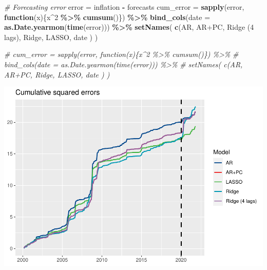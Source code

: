 \documentclass[
]{article}
\newenvironment{Shaded}{\begin{snugshade}}{\end{snugshade}}
\newcommand{\AttributeTok}[1]{\textcolor[rgb]{0.13,0.29,0.53}{#1}}
\newcommand{\CommentTok}[1]{\textcolor[rgb]{0.56,0.35,0.01}{\textit{#1}}}
\newcommand{\ControlFlowTok}[1]{\textcolor[rgb]{0.13,0.29,0.53}{\textbf{#1}}}
\newcommand{\DecValTok}[1]{\textcolor[rgb]{0.00,0.00,0.81}{#1}}
\newcommand{\FunctionTok}[1]{\textcolor[rgb]{0.13,0.29,0.53}{\textbf{#1}}}
\newcommand{\NormalTok}[1]{#1}
\newcommand{\OtherTok}[1]{\textcolor[rgb]{0.56,0.35,0.01}{#1}}
\newcommand{\SpecialCharTok}[1]{\textcolor[rgb]{0.81,0.36,0.00}{\textbf{#1}}}
\newcommand{\StringTok}[1]{\textcolor[rgb]{0.31,0.60,0.02}{#1}}
\begin{document}
\begin{Shaded}
\begin{Highlighting}[]
\CommentTok{\# Forecasting error}
\NormalTok{error }\OtherTok{=}\NormalTok{ inflation }\SpecialCharTok{{-}}\NormalTok{ forecasts}
\NormalTok{cum\_error }\OtherTok{=} \FunctionTok{sapply}\NormalTok{(error, }\ControlFlowTok{function}\NormalTok{(x)\{x}\SpecialCharTok{\^{}}\DecValTok{2} \SpecialCharTok{\%\textgreater{}\%} \FunctionTok{cumsum}\NormalTok{()\}) }\SpecialCharTok{\%\textgreater{}\%}
 \FunctionTok{bind\_cols}\NormalTok{(}\AttributeTok{date =} \FunctionTok{as.Date.yearmon}\NormalTok{(}\FunctionTok{time}\NormalTok{(error))) }\SpecialCharTok{\%\textgreater{}\%}
 \FunctionTok{setNames}\NormalTok{( }\FunctionTok{c}\NormalTok{(}\StringTok{\textquotesingle{}AR\textquotesingle{}}\NormalTok{, }\StringTok{\textquotesingle{}AR+PC\textquotesingle{}}\NormalTok{, }\StringTok{\textquotesingle{}Ridge (4 lags)\textquotesingle{}}\NormalTok{, }\StringTok{\textquotesingle{}Ridge\textquotesingle{}}\NormalTok{, }\StringTok{\textquotesingle{}LASSO\textquotesingle{}}\NormalTok{, }\StringTok{\textquotesingle{}date\textquotesingle{}}\NormalTok{ ) )}


\CommentTok{\# cum\_error = sapply(error, function(x)\{x\^{}2 \%\textgreater{}\% cumsum()\}) \%\textgreater{}\%}
\CommentTok{\#   bind\_cols(date = as.Date.yearmon(time(error))) \%\textgreater{}\%}
\CommentTok{\#   setNames( c(\textquotesingle{}AR\textquotesingle{}, \textquotesingle{}AR+PC\textquotesingle{}, \textquotesingle{}Ridge\textquotesingle{}, \textquotesingle{}LASSO\textquotesingle{}, \textquotesingle{}date\textquotesingle{} ) )}
\end{Highlighting}
\end{Shaded}

\includegraphics{Trabalho_Econo4_Q2_files/figure-latex/unnamed-chunk-26-1.pdf}
\end{document}
